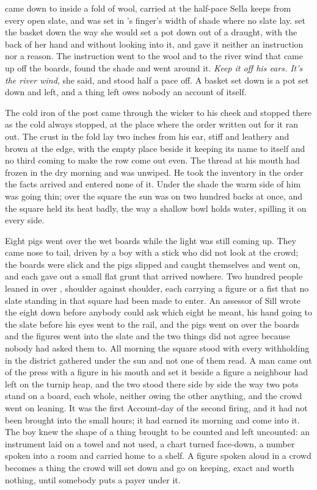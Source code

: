  came down to  inside a fold of wool, carried at the half-pace Sella keeps from every open slate, and was set in 's finger's width of shade where no slate lay.  set the basket down the way she would set a pot down out of a draught, with the back of her hand and without looking into it, and gave it neither an instruction nor a reason. The instruction went to the wool and to the river wind that came up off the boards, found the shade and went around it. \emph{Keep it off his ears. It's the river wind}, she said, and stood half a pace off. A basket set down is a pot set down and left, and a thing left owes nobody an account of itself.

The cold iron of the post came through the wicker to his cheek and stopped there as the cold always stopped, at the place where the order written out for it ran out. The crust in the fold lay two inches from his ear, stiff and leathery and brown at the edge, with the empty place beside it keeping its name to itself and no third coming to make the row come out even. The thread at his mouth had frozen in the dry morning and was unwiped. He took the inventory in the order the facts arrived and entered none of it. Under the shade the warm side of him was going thin; over the square the sun was on two hundred backs at once, and the square held its heat badly, the way a shallow bowl holds water, spilling it on every side.

Eight pigs went over the wet boards while the light was still coming up. They came nose to tail, driven by a boy with a stick who did not look at the crowd; the boards were slick and the pigs slipped and caught themselves and went on, and each gave out a small flat grunt that arrived nowhere. Two hundred people leaned in over , shoulder against shoulder, each carrying a figure or a fist that no slate standing in that square had been made to enter. An assessor of Sill wrote the eight down before anybody could ask which eight he meant, his hand going to the slate before his eyes went to the rail, and the pigs went on over the boards and the figures went into the slate and the two things did not agree because nobody had asked them to. All morning the square stood with every withholding in the district gathered under the sun and not one of them read. A man came out of the press with a figure in his mouth and set it beside a figure a neighbour had left on the turnip heap, and the two stood there side by side the way two pots stand on a board, each whole, neither owing the other anything, and the crowd went on leaning. It was the first Account-day of the second firing, and it had not been brought into the small hours; it had earned its morning and come into it. The boy knew the shape of a thing brought to be counted and left uncounted: an instrument laid on a towel and not used, a chart turned face-down, a number spoken into a room and carried home to a shelf. A figure spoken aloud in a crowd becomes a thing the crowd will set down and go on keeping, exact and worth nothing, until somebody puts a payer under it.

